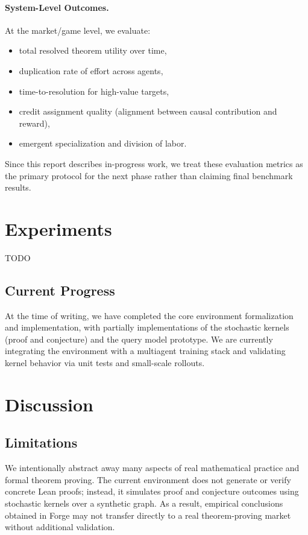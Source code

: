 \documentclass[letterpaper]{article} %
\begin{document}
\paragraph{System-Level Outcomes.}
At the market/game level, we evaluate:
\begin{itemize}
    \item total resolved theorem utility over time,
    \item duplication rate of effort across agents,
    \item time-to-resolution for high-value targets,
    \item credit assignment quality (alignment between causal contribution and reward),
    \item emergent specialization and division of labor.
\end{itemize}

Since this report describes in-progress work, we treat these evaluation metrics as the primary protocol for the next phase rather than claiming final benchmark results.

\section{Experiments}

TODO


\subsection{Current Progress}

At the time of writing, we have completed the core environment formalization and implementation, with partially implementations of the stochastic kernels (proof and conjecture) and the query model prototype. We are currently integrating the environment with a multiagent training stack and validating kernel behavior via unit tests and small-scale rollouts.

\section{Discussion}
\subsection{Limitations}

We intentionally abstract away many aspects of real mathematical practice and formal theorem proving. The current environment does not generate or verify concrete Lean proofs; instead, it simulates proof and conjecture outcomes using stochastic kernels over a synthetic graph. As a result, empirical conclusions obtained in Forge may not transfer directly to a real theorem-proving market without additional validation.
\end{document}
